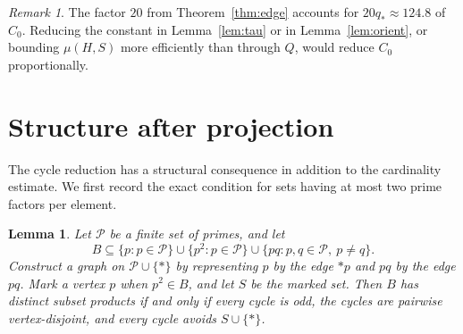\documentclass[11pt]{article}
\numberwithin{equation}{section}
\newtheorem{lemma}[theorem]{Lemma}
\theoremstyle{remark}
\newtheorem{remark}[theorem]{Remark}
\begin{document}
\begin{remark}
The factor $20$ from Theorem~\ref{thm:edge} accounts for $20q_*\approx124.8$ of $C_0$. Reducing the constant in Lemma~\ref{lem:tau} or in Lemma~\ref{lem:orient}, or bounding $\mu(H,S)$ more efficiently than through $Q$, would reduce $C_0$ proportionally.
\end{remark}

\section{Structure after projection}\label{sec:structure}
The cycle reduction has a structural consequence in addition to the cardinality estimate. We first record the exact condition for sets having at most two prime factors per element.

\begin{lemma}\label{lem:exact}
Let $\mathcal P$ be a finite set of primes, and let
\[
B\subseteq\{p:p\in\mathcal P\}\cup\{p^2:p\in\mathcal P\}\cup\{pq:p,q\in\mathcal P,\ p\ne q\}.
\]
Construct a graph on $\mathcal P\cup\{*\}$ by representing $p$ by the edge $*p$ and $pq$ by the edge $pq$. Mark a vertex $p$ when $p^2\in B$, and let $S$ be the marked set. Then $B$ has distinct subset products if and only if every cycle is odd, the cycles are pairwise vertex-disjoint, and every cycle avoids $S\cup\{*\}$.
\end{lemma}
\end{document}
